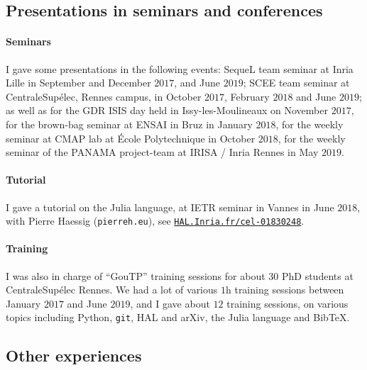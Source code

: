 \subsection{Presentations in seminars and conferences}

\paragraph{Seminars}
    I gave some presentations in the following events:
    SequeL team seminar at Inria Lille in September and December $2017$, and June $2019$;
    SCEE team seminar at CentraleSupélec, Rennes campus, in October $2017$, February $2018$ and June $2019$;
    as well as
    for the GDR ISIS day held in Issy-les-Moulineaux on November $2017$,
    for the brown-bag seminar at ENSAI in Bruz in January $2018$,
    for the weekly seminar at CMAP lab at École Polytechnique in October $2018$,
    for the weekly seminar of the PANAMA project-team at IRISA / Inria Rennes in May $2019$.

\paragraph{Tutorial}
    I gave a tutorial on the Julia language, at IETR seminar in Vannes in June $2018$,
    with Pierre Haessig (\texttt{pierreh.eu}), see \href{https://HAL.Inria.fr/cel-01830248}{\texttt{HAL.Inria.fr/cel-01830248}}.

\paragraph{Training}
    I was also in charge of ``GouTP'' training sessions for about $30$ PhD students at CentraleSupélec Rennes.
    We had a lot of various $1$h training sessions between January $2017$ and June $2019$,
    and I gave about $12$ training sessions, on various topics including Python, \texttt{git}, HAL and arXiv, the Julia language and Bib\TeX{}.


\subsection{Other experiences}


